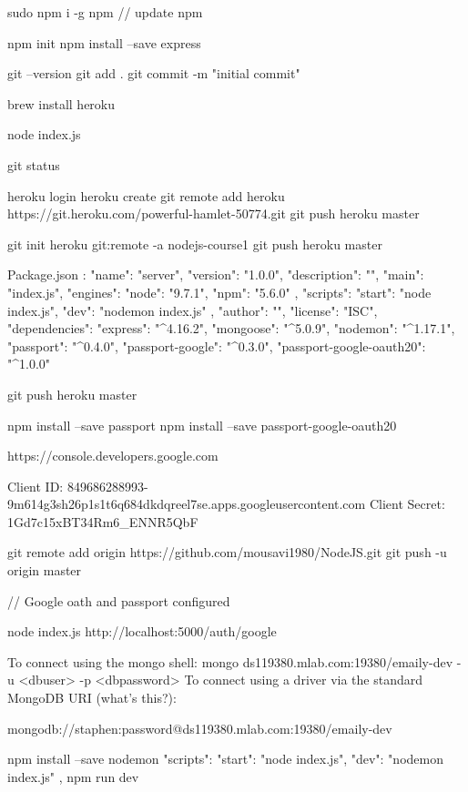 


sudo npm i -g npm  // update npm

npm init
npm install --save express

git --version
git add .
git commit -m "initial commit"

brew install heroku

node index.js

git status

heroku login
heroku create
git remote add heroku https://git.heroku.com/powerful-hamlet-50774.git
git push heroku master

git init
heroku git:remote -a nodejs-course1
git push heroku master

Package.json :
{
	"name": "server",
	"version": "1.0.0",
	"description": "",
	"main": "index.js",
	"engines": {
		"node": "9.7.1",
		"npm": "5.6.0"
	},
	"scripts": {
		"start": "node index.js",
		"dev": "nodemon index.js"
	},
	"author": "",
	"license": "ISC",
	"dependencies": {
		"express": "^4.16.2",
		"mongoose": "^5.0.9",
		"nodemon": "^1.17.1",
		"passport": "^0.4.0",
		"passport-google": "^0.3.0",
		"passport-google-oauth20": "^1.0.0"
	}
}


git push heroku master

npm install --save passport 
npm install --save passport-google-oauth20


https://console.developers.google.com

Client ID: 849686288993-9m614g3sh26p1s1t6q684dkdqreel7se.apps.googleusercontent.com
Client Secret: 1Gd7c15xBT34Rm6_ENNR5QbF

git remote add origin https://github.com/mousavi1980/NodeJS.git
git push -u origin master

// Google oath and passport configured

node index.js
http://localhost:5000/auth/google

To connect using the mongo shell:
mongo ds119380.mlab.com:19380/emaily-dev -u <dbuser> -p <dbpassword>
To connect using a driver via the standard MongoDB URI (what's this?):

mongodb://staphen:password@ds119380.mlab.com:19380/emaily-dev

npm install --save nodemon
"scripts": {
	"start": "node index.js",
	"dev": "nodemon index.js"
},
npm run dev
